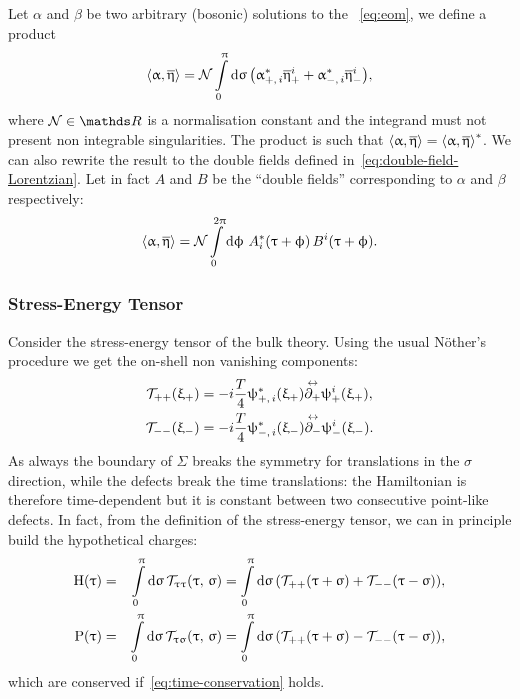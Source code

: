Let $\alpha$ and $\beta$ be two arbitrary (bosonic) solutions to the \eom~\eqref{eq:eom}, we define a product
\begin{equation}
  \left\langle \upalpha, \overline{\upeta} \right\rangle
  =
  \mathcal{N}
  \int\limits_{0}^{\uppi} \dd{\ensuremath{\upsigma}}
  \qty( \upalpha_{+,\, i}^* \overline{\upeta}_+^i + \upalpha_{-,\, i}^* \overline{\upeta}_-^i ),
  \label{eq:conserved-product}
\end{equation}
where $\cN \in \R$ is a normalisation constant and the integrand must not present non integrable singularities.
The product is such that $\left\langle \upalpha, \overline{\upeta} \right\rangle = \left\langle \upalpha, \overline{\upeta} \right\rangle^*$.
We can also rewrite the result to the double fields defined in~\eqref{eq:double-field-Lorentzian}.
Let in fact $A$ and $B$ be the ``double
fields'' corresponding to $\alpha$ and $\beta$ respectively:
\begin{equation}
  \left\langle \upalpha, \overline{\upeta} \right\rangle
  =
  \mathcal{N}
  \int\limits_{0}^{2\uppi} \dd{\ensuremath{\upphi}}\,
  A_i^*( \uptau + \upphi )\, B^i( \uptau + \upphi ).
  \label{eq:conserved-product-double-field}
\end{equation}

\subsubsection{Stress-Energy Tensor}

Consider the stress-energy tensor of the bulk theory.
Using the usual Nöther's procedure we get the on-shell non vanishing components:
\begin{equation}
  \begin{split}
    \mathcal{T}_{++}( \upxi_+ )
    & =
    -i \frac{T}{4} \uppsi_{+,\, i}^*( \upxi_+ ) \overset{\leftrightarrow}{\partial_{+}} \uppsi_+^i( \upxi_+ ),
    \\
    \mathcal{T}_{--}( \upxi_- )
    & =
    -i \frac{T}{4} \uppsi_{-,\, i}^*( \upxi_- )\overset{\leftrightarrow}{\partial_{-}} \uppsi_-^i( \upxi_- ).
  \end{split}
  \label{eq:stress-energy-tensor-lightcone}
\end{equation}
As always the boundary of $\Sigma$ breaks the symmetry for translations in the $\sigma$ direction, while the defects break the time translations: the Hamiltonian is therefore time-dependent but it is constant between two consecutive point-like defects.
In fact, from the definition of the stress-energy tensor, we can in principle
build the hypothetical charges:
\begin{eqnarray}
  \mathrm{H}( \uptau )
  & = &
  \int\limits_{0}^{\uppi} \dd{\ensuremath{\upsigma}}
  \mathcal{T}_{\uptau\uptau}( \uptau,\, \upsigma )
  =
  \int\limits_{0}^{\uppi} \dd{\ensuremath{\upsigma}}
  \qty( \mathcal{T}_{++}( \uptau + \upsigma ) + \mathcal{T}_{--}( \uptau - \upsigma ) ),
  \label{eq:hamiltonian}
  \\
  \mathrm{P}( \uptau )
  & = &
  \int\limits_{0}^{\uppi} \dd{\ensuremath{\upsigma}}
  \mathcal{T}_{\uptau\upsigma}( \uptau,\, \upsigma )
  =
  \int\limits_{0}^{\uppi} \dd{\ensuremath{\upsigma}}
  \qty( \mathcal{T}_{++}( \uptau + \upsigma ) - \mathcal{T}_{--}( \uptau - \upsigma ) ),
  \label{eq:momentum}
\end{eqnarray}
which are conserved if~\eqref{eq:time-conservation} holds.

